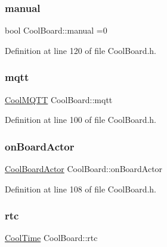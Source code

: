 \subsubsection{\texorpdfstring{manual}{manual}}
{\footnotesize\ttfamily bool Cool\+Board\+::manual =0\hspace{0.3cm}{\ttfamily [private]}}



Definition at line 120 of file Cool\+Board.\+h.

\mbox{\label{class_cool_board_a2399f44d7c23c1149a335cb3b46d90f1}} 
\subsubsection{\texorpdfstring{mqtt}{mqtt}}
{\footnotesize\ttfamily \hyperlink{class_cool_m_q_t_t}{Cool\+M\+Q\+TT} Cool\+Board\+::mqtt\hspace{0.3cm}{\ttfamily [private]}}



Definition at line 100 of file Cool\+Board.\+h.

\mbox{\label{class_cool_board_a4ac693895c21025b8808653f2a4316e6}} 
\subsubsection{\texorpdfstring{on\+Board\+Actor}{onBoardActor}}
{\footnotesize\ttfamily \hyperlink{class_cool_board_actor}{Cool\+Board\+Actor} Cool\+Board\+::on\+Board\+Actor\hspace{0.3cm}{\ttfamily [private]}}



Definition at line 108 of file Cool\+Board.\+h.

\mbox{\label{class_cool_board_a50d2a6716879d64a85f3c6b44ad63275}} 
\subsubsection{\texorpdfstring{rtc}{rtc}}
{\footnotesize\ttfamily \hyperlink{class_cool_time}{Cool\+Time} Cool\+Board\+::rtc\hspace{0.3cm}{\ttfamily [private]}}



